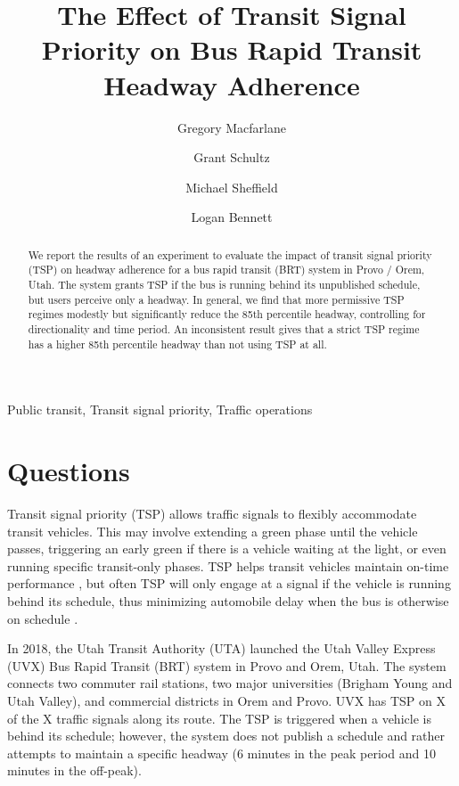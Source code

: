 \documentclass[3p, authoryear, review]{elsarticle} %
\begin{document}
\begin{frontmatter}

  \title{The Effect of Transit Signal Priority on Bus Rapid Transit Headway Adherence}
    \author[BYU]{Gregory Macfarlane}
    \author[BYU]{Grant Schultz}
    \author[WCG]{Michael Sheffield}
    \author[BYU]{Logan Bennett}
      \address[BYU]{Brigham Young University, Civil and Environmental Engineering Department, 430 Engineering Building, Provo, Utah 84602}
    \address[WCG]{Wall Consultant Group, 9980 S 300 W Ste 200 Sandy, UT 84070}
  
  \begin{abstract}
  We report the results of an experiment to evaluate the impact of transit signal priority (TSP) on headway adherence for a bus rapid transit (BRT) system in Provo / Orem, Utah. The system grants TSP if the bus is running behind its unpublished schedule, but users perceive only a headway. In general, we find that more permissive TSP regimes modestly but significantly reduce the 85th percentile headway, controlling for directionality and time period. An inconsistent result gives that a strict TSP regime has a higher 85th percentile headway than not using TSP at all.
  \end{abstract}
   \begin{keyword} Public transit, Transit signal priority, Traffic operations\end{keyword}
 \end{frontmatter}

\hypertarget{intro}{%
\section{Questions}\label{intro}}

Transit signal priority (TSP) allows traffic signals to flexibly accommodate
transit vehicles. This may involve extending a green phase until the vehicle
passes, triggering an early green if there is a vehicle waiting at the light, or
even running specific transit-only phases. TSP helps transit vehicles maintain
on-time performance \citep{Liu2018}, but often TSP will only engage at a signal if
the vehicle is running behind its schedule, thus minimizing automobile delay
when the bus is otherwise on schedule \citep{NI20201}.

In 2018, the Utah Transit Authority (UTA) launched the Utah Valley Express (UVX)
Bus Rapid Transit (BRT) system in Provo and Orem, Utah. The system connects
two commuter rail stations, two major universities (Brigham Young and Utah Valley),
and commercial districts in Orem and Provo. UVX has TSP on X of the X traffic
signals along its route. The TSP is triggered when a vehicle is behind its schedule;
however, the system does not publish a schedule and rather attempts to maintain
a specific headway (6 minutes in the peak period and 10 minutes in the off-peak).
\end{document}
